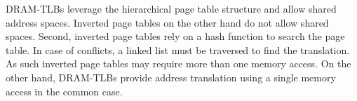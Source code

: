   DRAM-TLBs leverage the hierarchical
page table structure and allow shared address spaces. Inverted page
tables on the other hand do not allow shared spaces. Second, inverted
page tables rely on a hash function to search the page table. In case
of conflicts, a linked list must be traversed to find the translation.
As such inverted page tables may require more than one memory access.
On the other hand, DRAM-TLBs provide address translation using a
single memory access in the common case.


% 
% 
